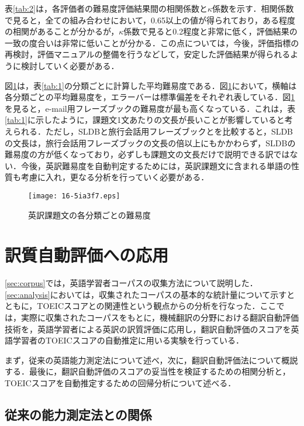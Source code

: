 \documentclass[japanese]{jnlp_1.4}
\begin{document}
表\ref{tab:2}は，各評価者の難易度評価結果間の相関係数と$\kappa$係数\cite{cohen_1960}を示す．相関係数で見ると，全ての組み合わせにおいて，0.65以上の値が得られており，ある程度の相関があることが分かるが，$\kappa$係数で見ると0.2程度と非常に低く，評価結果の一致の度合いは非常に低いことが分かる．この点については，今後，評価指標の再検討，評価マニュアルの整備を行うなどして，安定した評価結果が得られるように検討していく必要がある．

図\ref{fig:mean_diff}は，表\ref{tab:1}の分類ごとに計算した平均難易度である．図\ref{fig:mean_diff}において，横軸は各分類ごとの平均難易度を，エラーバーは標準偏差をそれぞれ表している．図\ref{fig:mean_diff}を見ると，e-mail用フレーズブックの難易度が最も高くなっている．これは，表\ref{tab:1}に示したように，課題文1文あたりの文長が長いことが影響していると考えられる．ただし，SLDBと旅行会話用フレーズブックとを比較すると，SLDBの文長は，旅行会話用フレーズブックの文長の倍以上にもかかわらず，SLDBの難易度の方が低くなっており，必ずしも課題文の文長だけで説明できる訳ではない．今後，英訳難易度を自動判定するためには，英訳課題文に含まれる単語の性質も考慮に入れ，更なる分析を行っていく必要がある．

\begin{figure}[t]
\begin{center}
\texttt{[image: 16-5ia3f7.eps]}
\end{center}
\caption{英訳課題文の各分類ごとの難易度}
\label{fig:mean_diff}
\end{figure}



\section{訳質自動評価への応用}
\label{sec:apli}

\ref{sec:corpus}では，英語学習者コーパスの収集方法について説明した．\ref{sec:analysis}においては，収集されたコーパスの基本的な統計量について示すとともに，TOEICスコアとの関連性という観点からの分析を行なった．ここでは，実際に収集されたコーパスをもとに，機械翻訳の分野における翻訳自動評価技術を，英語学習者による英訳の訳質評価に応用し，翻訳自動評価のスコアを英語学習者のTOEICスコアの自動推定に用いる実験を行っている．

まず，従来の英語能力測定法について述べ，次に，翻訳自動評価法について概説する．最後に，翻訳自動評価のスコアの妥当性を検証するための相関分析と，TOEICスコアを自動推定するための回帰分析について述べる．


\subsection{従来の能力測定法との関係}\label{subsec:conv}
\end{document}
